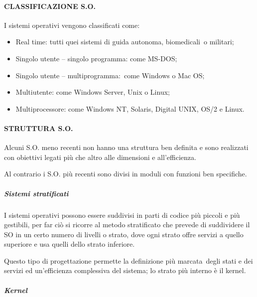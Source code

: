 \documentclass[
]{article}
\providecommand{\tightlist}{%
  \setlength{\itemsep}{0pt}\setlength{\parskip}{0pt}}
\begin{document}
{}

\paragraph{\texorpdfstring{{CLASSIFICAZIONE
S.O.}}{CLASSIFICAZIONE S.O.}}\label{h.2fcqtnu96k1h}

{I sistemi operativi vengono classificati come:}

{}

\begin{itemize}
\tightlist
\item
  {Real time}{: tutti quei sistemi di guida autonoma, }{biomedicali}{~o
  militari;}
\item
  {Singolo utente -- singolo programma}{: come MS-DOS;}
\item
  {Singolo utente -- }{multiprogramma}{:}{~come Windows o Mac OS;}
\item
  {Multiutente}{: come Windows Server, Unix o Linux;}
\item
  {Multiprocessore}{: come Windows NT, Solaris, Digital UNIX, OS/2 e
  Linux.}
\end{itemize}

{}

\paragraph{\texorpdfstring{{STRUTTURA
S.O.}}{STRUTTURA S.O.}}\label{h.mf59peh2dtqj}

{Alcuni S.O. meno recenti non hanno una struttura ben definita e sono
realizzati con obiettivi legati più che altro alle dimensioni e
all'efficienza.}

{Al contrario i S.O. più recenti sono divisi in moduli con funzioni ben
specifiche.}

\subparagraph{\texorpdfstring{{Sistemi
stratificati}}{Sistemi stratificati}}\label{h.akr3lkhw2anm}

{I sistemi operativi possono essere suddivisi in parti di codice più
piccoli e più gestibili, per far ciò si ricorre al metodo stratificato
che prevede di suddividere il SO in un certo numero di livelli o strato,
dove ogni strato offre servizi a quello superiore e usa quelli dello
strato inferiore.}

{Questo tipo di progettazione permette la definizione più
}{marcata}{~degli stati e dei servizi ed un'efficienza complessiva del
sistema; lo strato più interno è il }{kernel}{.}

\subparagraph{\texorpdfstring{{Kernel}}{Kernel}}\label{h.rvb59j9w1dsu}
\end{document}
